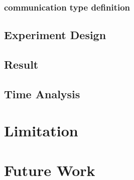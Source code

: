 \documentclass[paper=a4, fontsize=11pt]{scrartcl}
\numberwithin{equation}{section}		%
\numberwithin{figure}{section}			%
\numberwithin{table}{section}				%
\begin{document}
\subsubsection{communication type definition}

\subsection{Experiment Design}
\subsection{Result}
\subsection{Time Analysis}
\section{Limitation}


\section{Future Work}



 


\end{document}
